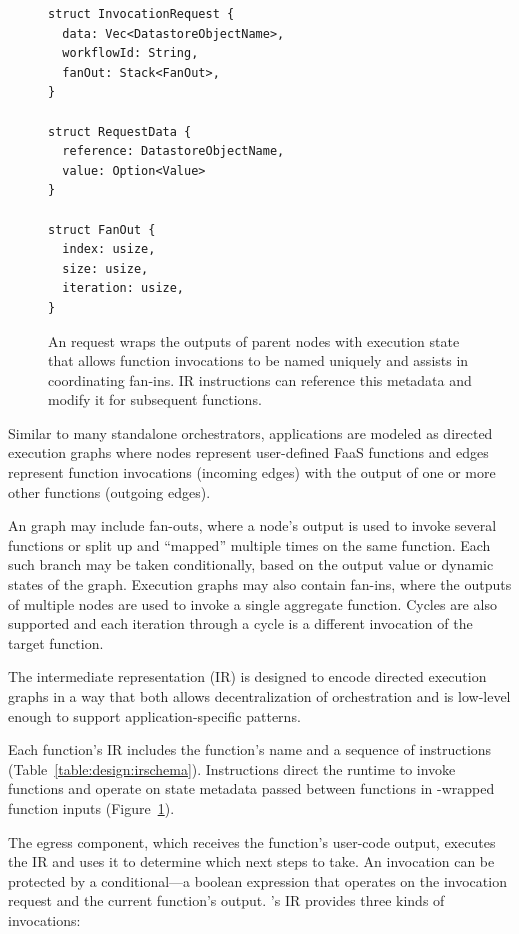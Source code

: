 \begin{figure}[t]
    \centering
    \begin{verbatim}
struct InvocationRequest {
  data: Vec<DatastoreObjectName>,
  workflowId: String,
  fanOut: Stack<FanOut>,
}

struct RequestData {
  reference: DatastoreObjectName,
  value: Option<Value>
}

struct FanOut {
  index: usize,
  size: usize,
  iteration: usize,
}
    \end{verbatim}
    \caption{An \name{} request wraps the outputs of parent nodes with execution
state that allows function invocations to be named uniquely and assists in
coordinating fan-ins. \name{} IR instructions can reference this metadata and
modify it for subsequent functions.}
    \label{fig:design:unum-request}
\end{figure}

Similar to many standalone orchestrators, \name{} applications are modeled as
directed execution graphs where nodes represent user-defined FaaS functions
and edges represent function invocations (incoming edges) with the output of
one or more other functions (outgoing edges).

An \name{} graph may include fan-outs, where a node's output is used to invoke
several functions or split up and ``mapped'' multiple times on the same
function. Each such branch may be taken conditionally, based on the output
value or dynamic states of the graph. Execution graphs may also contain
fan-ins, where the outputs of multiple nodes are used to invoke a single
aggregate function. Cycles are also supported and each iteration through a
cycle is a different invocation of the target function.

The \name{} intermediate representation (IR) is designed to encode directed
execution graphs in a way that both allows decentralization of orchestration
and is low-level enough to support application-specific patterns.

Each function's IR includes the function's name and a sequence of instructions
(Table~\ref{table:design:irschema}). Instructions direct the runtime to invoke
functions and operate on state metadata passed between functions in
\name{}-wrapped function inputs (Figure~\ref{fig:design:unum-request}).

The egress component, which receives the function's user-code output, executes
the IR and uses it to determine which next steps to take. An invocation can be
protected by a conditional---a boolean expression that operates on the
invocation request and the current function's output. \name{}'s IR provides
three kinds of invocations:

